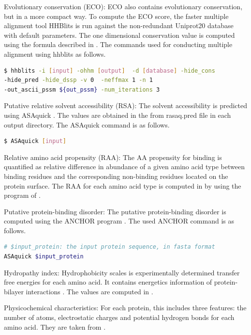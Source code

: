 Evolutionary conservation (ECO): ECO also contains evolutionary conservation, but in a more compact way. To compute the ECO score, the faster multiple alignment tool HHBlits \cite{remmert2012hhblits} is run against the non-redundant Uniprot20 database with default parameters. The one dimensional conservation value is computed using the formula described in \cite{zhang2019comprehensive}. The commands used for conducting multiple alignment using hhblits as follows.
\begin{lstlisting}[language=bash,frame=single]
$ hhblits -i [input] -ohhm [output]  -d [database] -hide_cons 
-hide_pred -hide_dssp -v 0  -neffmax 1 -n 1
-out_ascii_pssm ${out_pssm} -num_iterations 3
\end{lstlisting}

Putative relative solvent accessibility (RSA): The solvent accessibility is predicted using ASAquick \cite{faraggi2014accurate}. The values are obtained in the from rasaq.pred file in each output directory. The ASAquick command is as follows.
\begin{lstlisting}[language=bash,frame=single]
$ ASAquick [input]
\end{lstlisting}


Relative amino acid propensity (RAA): The AA propensity for binding is quantified as relative difference in abundance of a given amino acid type between binding residues and the corresponding non-binding residues located on the protein surface. The RAA for each amino acid type is computed in \cite{zhang2019comprehensive} by using the program of  \cite{vacic2007composition}.

Putative protein-binding disorder: The putative protein-binding disorder is computed using the ANCHOR program \cite{dosztanyi2009anchor}. The used ANCHOR command is as follows.
\begin{lstlisting}[language=bash,frame=single]
# $input_protein: the input protein sequence, in fasta format
ASAquick $input_protein
\end{lstlisting}
Hydropathy index: Hydrophobicity scales is experimentally determined transfer free energies for each amino acid. It contains energetics information of protein-bilayer interactions \cite{wimley1996experimentally}. The values are computed in \cite{kyte1982simple}.

Physicochemical characteristics: For each protein, this includes three features: the number of atoms, electrostatic charges and potential hydrogen bonds for each amino acid. They are taken from \cite{zhang2019sequence}.

